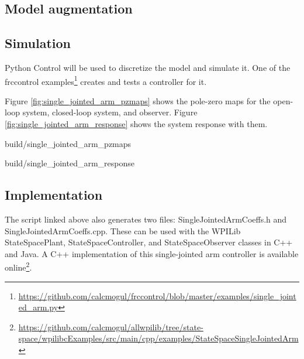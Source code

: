 \subsection{Model augmentation}

\subsection{Simulation}

Python Control will be used to discretize the model and simulate it. One of the
frccontrol examples\footnote{\url{https://github.com/calcmogul/frccontrol/blob/master/examples/single_jointed_arm.py}}
creates and tests a controller for it.

Figure \ref{fig:single_jointed_arm_pzmaps} shows the pole-zero maps for the
open-loop system, closed-loop system, and observer. Figure
\ref{fig:single_jointed_arm_response} shows the system response with them.

\begin{svg}{build/single_jointed_arm_pzmaps}
  \caption{Drivetrain pole-zero maps}
  \label{fig:single_jointed_arm_pzmaps}
\end{svg}

\begin{svg}{build/single_jointed_arm_response}
  \caption{Single-jointed arm response}
  \label{fig:single_jointed_arm_response}
\end{svg}

\subsection{Implementation}

The script linked above also generates two files: SingleJointedArmCoeffs.h and
SingleJointedArmCoeffs.cpp. These can be used with the WPILib StateSpacePlant,
StateSpaceController, and StateSpaceObserver classes in C++ and Java. A C++
implementation of this single-jointed arm controller is available
online\footnote{\url{https://github.com/calcmogul/allwpilib/tree/state-space/wpilibcExamples/src/main/cpp/examples/StateSpaceSingleJointedArm}}.
